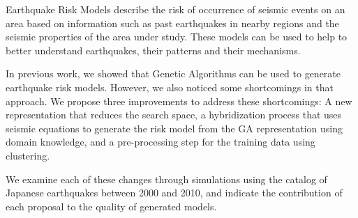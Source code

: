 Earthquake Risk Models describe the risk of occurrence of seismic
events on an area based on information such as past earthquakes
in nearby regions and the seismic properties of the area under study.
These models can be used to help to better understand earthquakes,
their patterns and their mechanisms.

In previous work, we showed that Genetic Algorithms can be used to
generate earthquake risk models. However, we also noticed some
shortcomings in that approach. We propose three improvements to
address these shortcomings: A new representation that reduces the
search space, a hybridization process that uses seismic equations to
generate the risk model from the GA representation using domain
knowledge, and a pre-processing step for the training data using
clustering.

We examine each of these changes through simulations using the catalog
of Japanese earthquakes between 2000 and 2010, and indicate the
contribution of each proposal to the quality of generated models.
